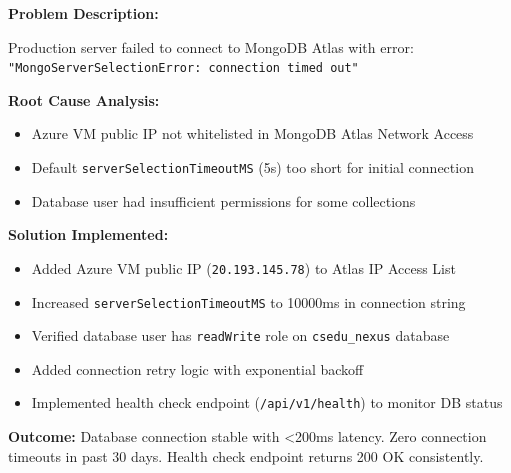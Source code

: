 \documentclass[12pt,a4paper]{article}
\begin{document}
\begin{tcolorbox}[colback=LightBlue, colframe=DarkTeal, title=\textbf{Challenge 5: MongoDB Atlas Connection Timeouts}, fonttitle=\bfseries]

\textbf{Problem Description:}

Production server failed to connect to MongoDB Atlas with error: \texttt{"MongoServerSelectionError: connection timed out"}

\textbf{Root Cause Analysis:}
\begin{itemize}[noitemsep]
  \item Azure VM public IP not whitelisted in MongoDB Atlas Network Access
  \item Default \texttt{serverSelectionTimeoutMS} (5s) too short for initial connection
  \item Database user had insufficient permissions for some collections
\end{itemize}

\textbf{Solution Implemented:}
\begin{itemize}[noitemsep]
  \item Added Azure VM public IP (\texttt{20.193.145.78}) to Atlas IP Access List
  \item Increased \texttt{serverSelectionTimeoutMS} to 10000ms in connection string
  \item Verified database user has \texttt{readWrite} role on \texttt{csedu\_nexus} database
  \item Added connection retry logic with exponential backoff
  \item Implemented health check endpoint (\texttt{/api/v1/health}) to monitor DB status
\end{itemize}

\textbf{Outcome:} Database connection stable with <200ms latency. Zero connection timeouts in past 30 days. Health check endpoint returns 200 OK consistently.
\end{tcolorbox}

\vspace{8pt}
\end{document}
